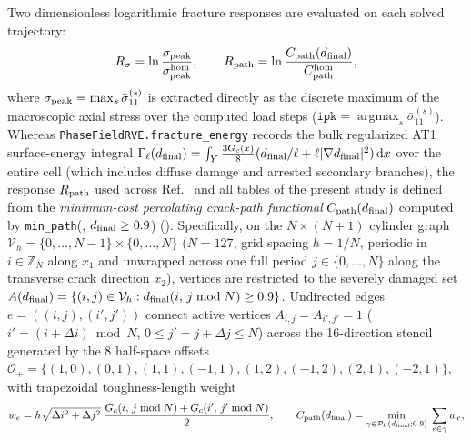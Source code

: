 \documentclass[preprint,11pt,a4paper]{elsarticle}
\newcommand{\dd}{\,\mathrm d}
\begin{document}
Two dimensionless logarithmic fracture responses are evaluated on each solved trajectory:
\begin{equation}
R_\sigma = \ln\frac{\sigma_{\rm peak}}{\sigma_{\rm peak}^{\rm hom}},
\qquad
R_{\rm path} = \ln\frac{C_{\rm path}(d_{\rm final})}{C_{\rm path}^{\rm hom}},
\label{eq:at1_responses}
\end{equation}
where $\sigma_{\rm peak}=\max_s\bar\sigma_{11}^{(s)}$ is extracted directly as the discrete maximum of the macroscopic axial stress over the computed load steps ($\texttt{ipk}=\operatorname{argmax}_s\bar\sigma_{11}^{(s)}$). Whereas \texttt{PhaseFieldRVE.fracture\_energy} records the bulk regularized AT1 surface-energy integral $\Gamma_\ell(d_{\rm final})=\int_Y\frac{3G_c(x)}{8}(d_{\rm final}/\ell+\ell|\nabla d_{\rm final}|^2)\dd x$ over the entire cell (which includes diffuse damage and arrested secondary branches), the response $R_{\rm path}$ used across Ref.~\cite{GomezOvalle2026} and all tables of the present study is defined from the \emph{minimum-cost percolating crack-path functional} $C_{\rm path}(d_{\rm final})$ computed by \texttt{min\_path}(, $d_{\rm final}\ge 0.9$) (). Specifically, on the $N\times(N+1)$ cylinder graph $\mathcal V_h=\{0,\dots,N-1\}\times\{0,\dots,N\}$ ($N=127$, grid spacing $h=1/N$, periodic in $i\in\mathbb Z_N$ along $x_1$ and unwrapped across one full period $j\in\{0,\dots,N\}$ along the transverse crack direction $x_2$), vertices are restricted to the severely damaged set $A(d_{\rm final})=\{(i,j)\in\mathcal V_h : d_{\rm final}(i,\,j\bmod N)\ge 0.9\}$. Undirected edges $e=((i,j),(i',j'))$ connect active vertices $A_{i,j}=A_{i',j'}=1$ ($i'=(i+\Delta i)\bmod N$, $0\le j'=j+\Delta j\le N$) across the 16-direction stencil generated by the 8 half-space offsets $\mathcal O_+=\{(1,0),(0,1),(1,1),(-1,1),(1,2),(-1,2),(2,1),(-2,1)\}$, with trapezoidal toughness-length weight
\begin{equation}
w_e = h\sqrt{\Delta i^2+\Delta j^2}\;\frac{G_c(i,\,j\bmod N)+G_c(i',\,j'\bmod N)}{2},
\qquad
C_{\rm path}(d_{\rm final}) = \min_{\gamma\in\mathcal P_h(d_{\rm final};0.9)}\;\sum_{e\in\gamma} w_e,
\label{eq:cpath_def}
\end{equation}
\end{document}
